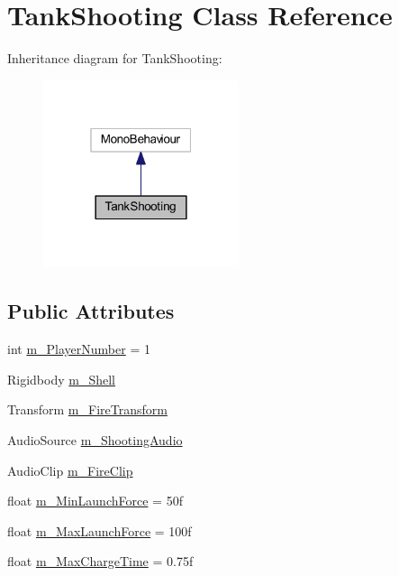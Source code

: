 \hypertarget{class_tank_shooting}{}\section{Tank\+Shooting Class Reference}
\label{class_tank_shooting}


Inheritance diagram for Tank\+Shooting\+:
\nopagebreak
\begin{figure}[H]
\begin{center}
\leavevmode
\includegraphics[width=163pt]{class_tank_shooting__inherit__graph}
\end{center}
\end{figure}
\subsection*{Public Attributes}
\begin{DoxyCompactItemize}
\item 
int \hyperlink{class_tank_shooting_afbdc9693b332517975e952436c04b6a0}{m\+\_\+\+Player\+Number} = 1
\item 
Rigidbody \hyperlink{class_tank_shooting_ab574880baae316f960a2711a3f357001}{m\+\_\+\+Shell}
\item 
Transform \hyperlink{class_tank_shooting_a11258331a4d05472ffc508152f8e10e0}{m\+\_\+\+Fire\+Transform}
\item 
Audio\+Source \hyperlink{class_tank_shooting_a7d8d764d8c953938735573157284ac6a}{m\+\_\+\+Shooting\+Audio}
\item 
Audio\+Clip \hyperlink{class_tank_shooting_a32f4525a7cb238b5684e8bcf3dca24fb}{m\+\_\+\+Fire\+Clip}
\item 
float \hyperlink{class_tank_shooting_ae01a2b150c6391d6f9bdf626ee7e273b}{m\+\_\+\+Min\+Launch\+Force} = 50f
\item 
float \hyperlink{class_tank_shooting_aec0f5624d699ed4a0c7f8b54a88fc1c7}{m\+\_\+\+Max\+Launch\+Force} = 100f
\item 
float \hyperlink{class_tank_shooting_af8d76f24ef06557eacf3d80cae349dee}{m\+\_\+\+Max\+Charge\+Time} = 0.\+75f
\end{DoxyCompactItemize}


